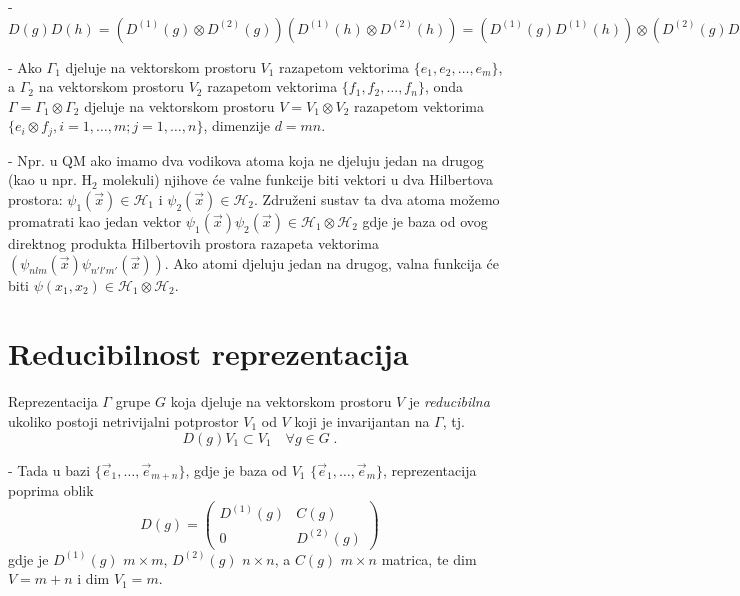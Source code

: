 - $D(g)D(h)=(D^{(1)}(g)\otimes D^{(2)}(g))(D^{(1)}(h)\otimes
  D^{(2)}(h)) = (D^{(1)}(g)D^{(1)}(h))\otimes
 (D^{(2)}(g)D^{(2)}(h)) = D^{(1)}(gh)\otimes D^{(2)}(gh) = D(gh)$


- Ako $\Gamma_1$ djeluje na vektorskom prostoru $V_1$ razapetom
vektorima $\{e_1, e_2, \ldots, e_m\}$, a $\Gamma_2$ na vektorskom
prostoru $V_2$ razapetom vektorima $\{f_1, f_2, \ldots, f_n\}$,
onda $\Gamma=\Gamma_1 \otimes \Gamma_2$ djeluje na vektorskom
prostoru $V=V_1 \otimes V_2$ razapetom vektorima
$\{e_{i}\otimes f_{j}, i=1,\ldots, m; j=1,\ldots, n\}$,
dimenzije $d=mn$.

- Npr. u QM ako imamo dva vodikova atoma koja ne djeluju jedan
na drugog (kao u npr. H$_2$ molekuli) njihove će valne funkcije 
biti vektori u dva Hilbertova prostora:
$\psi_{1}(\vec{x})\in \mathcal{H}_1$ i 
$\psi_{2}(\vec{x})\in \mathcal{H}_2$.
Združeni sustav ta dva atoma možemo promatrati kao jedan vektor
$\psi_{1}(\vec{x})\psi_{2}(\vec{x}) \in \mathcal{H}_1
\otimes \mathcal{H}_2$ gdje je baza od ovog direktnog
produkta Hilbertovih prostora razapeta vektorima
$(\psi_{nlm}(\vec{x})\psi_{n'l'm'}(\vec{x}))$.
Ako atomi djeluju jedan na drugog, valna funkcija će biti
$\psi(x_1, x_2) \in \mathcal{H}_1\otimes \mathcal{H}_2$.

\section{Reducibilnost reprezentacija}

\begin{definicija}
Reprezentacija $\Gamma$ grupe $G$ koja djeluje na vektorskom
prostoru $V$  je \emph{reducibilna} ukoliko postoji netrivijalni
potprostor $V_{1}$ od $V$ koji je invarijantan na $\Gamma$, tj.
\begin{displaymath}
    D(g)V_{1}\subset V_{1} \quad \forall g \in G \;.
\end{displaymath}
\end{definicija}

- Tada u bazi $\{\vec{e}_1, \ldots, \vec{e}_{m+n} \}$, gdje je baza od
$V_1$ $\{\vec{e}_1, \ldots, \vec{e}_{m} \}$, reprezentacija
poprima oblik
\begin{displaymath}
 D(g) = \left(
\begin{array}{cc}
  D^{(1)}(g) & C(g) \\
     0       & D^{(2)}(g) 
\end{array} \right)
\end{displaymath}
gdje je $D^{(1)}(g)$ $m\times m$, $D^{(2)}(g)$ $n\times n$,
a $C(g)$ $m\times n$ matrica, te dim $V=m+n$ i dim $V_1=m$.

